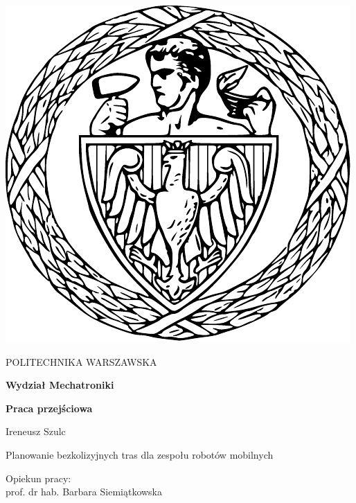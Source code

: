 
\thispagestyle {empty}

\begin{center}
	\includegraphics[scale=0.4]{img/pw}
	
	\vspace{0.5cm}
	
	{\fontsize{20}{20}\selectfont POLITECHNIKA WARSZAWSKA}
	
	\vspace{1.0cm}
	
	\textbf{{\fontsize{14}{14}\selectfont Wydział Mechatroniki}}
	
	\vspace{1.5cm}
	
	\textbf{{\fontsize{14}{14}\selectfont Praca przejściowa}}

	\vspace{2.0cm}
	
	{\fontsize{14}{14}\selectfont Ireneusz Szulc}
	
	\vspace{1cm}
	
	{\fontsize{28}{28}\selectfont Planowanie bezkolizyjnych tras dla zespołu robotów mobilnych}
	
	\vspace{1cm}
	\begin{flushright}
		{\fontsize{14}{14}\selectfont Opiekun pracy: \\ 
		prof. dr hab. Barbara Siemiątkowska}
	

\end{flushright}
\end{center}
